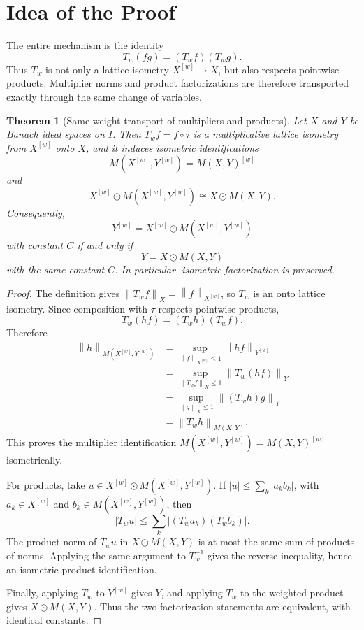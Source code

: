 \documentclass[11pt]{article}
\newtheorem{theorem}{Theorem}
\newcommand{\norm}[1]{\left\lVert #1 \right\rVert}
\newcommand{\odotprod}{\odot}
\begin{document}
\section*{Idea of the Proof}

The entire mechanism is the identity
\[
  T_w(fg)=(T_w f)(T_w g).
\]
Thus \(T_w\) is not only a lattice isometry \(X^{[w]}\to X\), but also respects
pointwise products.  Multiplier norms and product factorizations are therefore
transported exactly through the same change of variables.

\begin{theorem}[Same-weight transport of multipliers and products]
Let \(X\) and \(Y\) be Banach ideal spaces on \(I\).  Then \(T_w f=f\circ\tau\)
is a multiplicative lattice isometry from \(X^{[w]}\) onto \(X\), and it
induces isometric identifications
\[
  M(X^{[w]},Y^{[w]}) = M(X,Y)^{[w]}
\]
and
\[
  X^{[w]}\odotprod M(X^{[w]},Y^{[w]})
  \cong
  X\odotprod M(X,Y).
\]
Consequently,
\[
  Y^{[w]} = X^{[w]}\odotprod M(X^{[w]},Y^{[w]})
\]
with constant \(C\) if and only if
\[
  Y = X\odotprod M(X,Y)
\]
with the same constant \(C\).  In particular, isometric factorization is
preserved.
\end{theorem}

\begin{proof}
The definition gives \(\norm{T_w f}_X=\norm{f}_{X^{[w]}}\), so \(T_w\) is an
onto lattice isometry.  Since composition with \(\tau\) respects pointwise
products,
\[
  T_w(hf)=(T_w h)(T_w f).
\]
Therefore
\[
\begin{aligned}
  \norm{h}_{M(X^{[w]},Y^{[w]})}
    &= \sup_{\norm{f}_{X^{[w]}}\le 1} \norm{hf}_{Y^{[w]}}        \\
    &= \sup_{\norm{T_w f}_{X}\le 1} \norm{T_w(hf)}_{Y}           \\
    &= \sup_{\norm{g}_{X}\le 1} \norm{(T_w h)g}_{Y}              \\
    &= \norm{T_w h}_{M(X,Y)} .
\end{aligned}
\]
This proves the multiplier identification \(M(X^{[w]},Y^{[w]})=M(X,Y)^{[w]}\)
isometrically.

For products, take \(u\in X^{[w]}\odotprod M(X^{[w]},Y^{[w]})\).  If
\(|u|\le \sum_k |a_k b_k|\), with \(a_k\in X^{[w]}\) and
\(b_k\in M(X^{[w]},Y^{[w]})\), then
\[
  |T_wu|\le \sum_k |(T_wa_k)(T_wb_k)|.
\]
The product norm of \(T_wu\) in \(X\odotprod M(X,Y)\) is at most the same
sum of products of norms.  Applying the same argument to \(T_w^{-1}\) gives the
reverse inequality, hence an isometric product identification.

Finally, applying \(T_w\) to \(Y^{[w]}\) gives \(Y\), and applying \(T_w\) to the
weighted product gives \(X\odotprod M(X,Y)\).  Thus the two factorization
statements are equivalent, with identical constants.
\end{proof}
\end{document}
